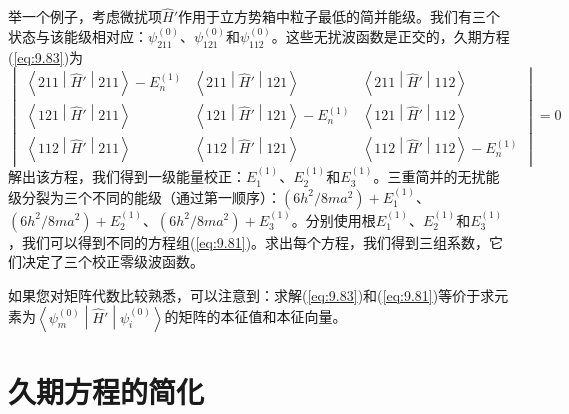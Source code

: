     举一个例子，考虑微扰项$\hat{H}'$作用于立方势箱中粒子最低的简并能级。我们有三个状态与该能级相对应：$\psi_{211}^{\left(0\right)}$、$\psi_{121}^{\left(0\right)}$和$\psi_{112}^{\left(0\right)}$。这些无扰波函数是正交的，久期方程(\ref{eq:9.83})为
    \begin{equation}
        \begin{vmatrix}
            \left\langle 211 \middle| \hat{H}' \middle| 211 \right\rangle - E_n^{\left(1\right)} & \left\langle 211 \middle| \hat{H}' \middle| 121 \right\rangle & \left\langle 211 \middle| \hat{H}' \middle| 112 \right\rangle \\
            \left\langle 121 \middle| \hat{H}' \middle| 211 \right\rangle & \left\langle 121 \middle| \hat{H}' \middle| 121 \right\rangle - E_n^{\left(1\right)} & \left\langle 121 \middle| \hat{H}' \middle| 112 \right\rangle \\
            \left\langle 112 \middle| \hat{H}' \middle| 211 \right\rangle & \left\langle 112 \middle| \hat{H}' \middle| 121 \right\rangle & \left\langle 112 \middle| \hat{H}' \middle| 112 \right\rangle - E_n^{\left(1\right)}
        \end{vmatrix} = 0
        \label{eq:9.87}
    \end{equation}
    解出该方程，我们得到一级能量校正：$E_1^{\left(1\right)}$、$E_2^{\left(1\right)}$和$E_3^{\left(1\right)}$。三重简并的无扰能级分裂为三个不同的能级（通过第一顺序）：$\left(6h^2/8ma^2\right) + E_1^{\left(1\right)}$、$\left(6h^2/8ma^2\right) + E_2^{\left(1\right)}$、$\left(6h^2/8ma^2\right) + E_3^{\left(1\right)}$。分别使用根$E_1^{\left(1\right)}$、$E_2^{\left(1\right)}$和$E_3^{\left(1\right)}$，我们可以得到不同的方程组(\ref{eq:9.81})。求出每个方程，我们得到三组系数，它们决定了三个校正零级波函数。

    如果您对矩阵代数比较熟悉，可以注意到：求解(\ref{eq:9.83})和(\ref{eq:9.81})等价于求元素为$\left\langle \psi_m^{\left(0\right)} \middle| \hat{H}' \middle| \psi_i^{\left(0\right)} \right\rangle$的矩阵的本征值和本征向量。

\section{久期方程的简化}
\label{sec:9.6 Simplification of the Duration Equation}

